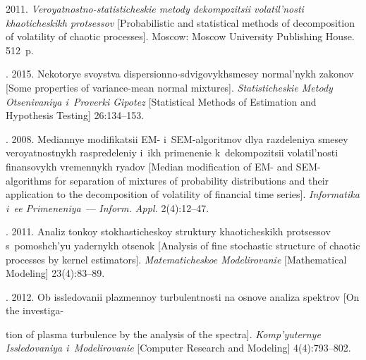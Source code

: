   \begin{multicols}{2}

\renewcommand{\bibname}{\protect\rmfamily References}

{\small\frenchspacing
 {%
 \begin{thebibliography}{99}
 2011. 
\textit{Veroyatnostno-statisticheskie metody dekompozitsii 
volatil'nosti khaoticheskikh protsessov} [Probabilistic and statistical methods of 
decomposition of volatility of chaotic processes]. Moscow: Moscow University
Publishing House. 512~p.

. 
2015. Nekotorye svoystva dispersionno-sdvigovykh\linebreak smesey normal'nykh zakonov 
[Some properties of variance-mean normal mixtures]. 
\textit{Statisticheskie Metody Otsenivaniya i~Proverki Gipotez}
[Statistical Methods of Estimation and Hypothesis Testing] 26:134--153.

. 
2008. Mediannye modifikatsii EM- i~SEM-algoritmov dlya razdeleniya smesey 
veroyatnostnykh raspredeleniy i~ikh primenenie k~dekompozitsii volatil'nosti 
finansovykh vremennykh ryadov [Median modification of EM- and SEM-algorithms for 
separation of mixtures of probability distributions and their application to 
the decomposition of volatility of financial time series]. 
\textit{Informatika i~ee Primeneniya}~--- \textit{Inform. Appl.} 2(4):12--47.

. 
2011. Analiz tonkoy stokha\-sti\-che\-skoy struktury khaoticheskikh protsessov 
s~pomoshch'yu yadernykh otsenok [Analysis of fine stochastic structure 
of chaotic processes by kernel estimators]. \textit{Matematicheskoe 
Modelirovanie} [Mathematical Modeling] 23(4):83--89.

. 2012. Ob issledovanii plazmennoy turbulentnosti na osnove 
analiza spektrov [On the investiga-\linebreak\vspace*{-12pt}

\columnbreak

\noindent
tion of plasma turbulence by the analysis of the spectra]. 
\textit{Komp'yuternye Issledovaniya i~Modelirovanie} [Computer Research and 
Modeling] 4(4):793--802.


\end{thebibliography}}}
\end{multicols}
